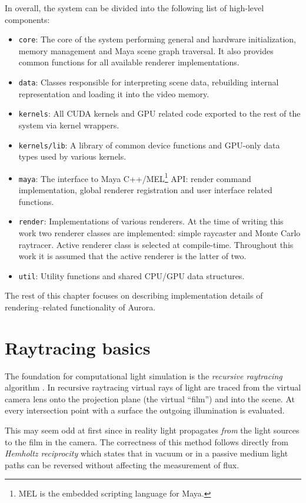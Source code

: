 In overall, the system can be divided into the following list of high-level components:
\begin{itemize}
\item \texttt{core}: The core of the system performing general and hardware initialization, memory management and Maya scene graph traversal. It also provides common functions for all available renderer implementations.
\item \texttt{data}: Classes responsible for interpreting scene data, rebuilding internal representation and loading it into the video memory.
\item \texttt{kernels}: All CUDA kernels and GPU related code exported to the rest of the system via kernel wrappers.
\item \texttt{kernels/lib}: A library of common device functions and GPU-only data types used by various kernels.
\item \texttt{maya}: The interface to Maya C++/MEL\footnote{MEL is the embedded scripting language for Maya.} API: render command implementation, global renderer registration and user interface related functions.
\item \texttt{render}: Implementations of various renderers. At the time of writing this work two renderer classes are implemented: simple raycaster and Monte Carlo raytracer. Active renderer class is selected at compile-time. Throughout this work it is assumed that the active renderer is the latter of two.
\item \texttt{util}: Utility functions and shared CPU/GPU data structures.
\end{itemize}

The rest of this chapter focuses on describing implementation details of rendering--related functionality of Aurora. \vfill

\section{Raytracing basics}
The foundation for computational light simulation is the \emph{recursive raytracing} algorithm \parencite{whitted79}. In recursive raytracing virtual rays of light are traced from the virtual camera lens onto the projection plane (the virtual ``film'') and into the scene. At every intersection point with a surface the outgoing illumination is evaluated.

This may seem odd at first since in reality light propagates \emph{from} the light sources to the film in the camera. The correctness of this method follows directly from \emph{Hemholtz reciprocity} \parencite{hapke93} which states that in vacuum or in a passive medium light paths can be reversed without affecting the measurement of flux.

